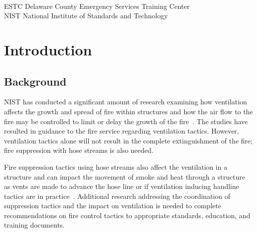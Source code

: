 \documentclass[12pt,oneside]{book}
\begin{document}
\begin{tabbing}
\hspace{1.5in} \= \\
ESTC \> Delaware County Emergency Services Training Center \\
NIST \> National Institute of Standards and Technology \\
\end{tabbing}

\newpage


\mainmatter


\chapter{Introduction}
\label{chap:intro}
\section{Background}
\label{sec:background}

NIST has conducted a significant amount of research examining how ventilation affects the growth and spread of fire within structures and how the air flow to the fire may be controlled to limit or delay the growth of the fire~\cite{}. The studies have resulted in guidance to the fire service regarding ventilation tactics. However, ventilation tactics alone will not result in the complete extinguishment of the fire; fire suppression with hose streams is also needed.

Fire suppression tactics using hose streams also affect the ventilation in a structure and can impact the movement of smoke and heat through a structure as vents are made to advance the hose line or if ventilation inducing handline tactics are in practice~\cite{}. Additional research addressing the coordination of suppression tactics and the impact on ventilation is needed to complete recommendations on fire control tactics to appropriate standards, education, and training documents.
\end{document}
